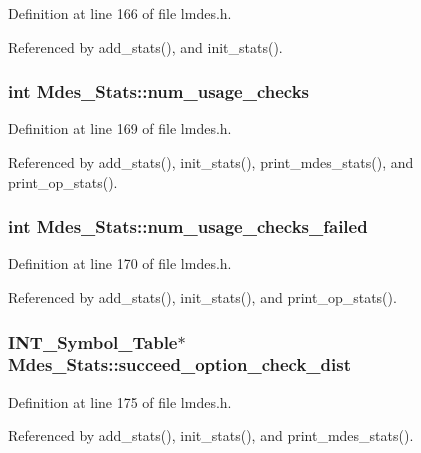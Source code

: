 Definition at line 166 of file lmdes.h.

Referenced by add\_\-stats(), and init\_\-stats().
\subsubsection{\setlength{\rightskip}{0pt plus 5cm}int \bf{Mdes\_\-Stats::num\_\-usage\_\-checks}}\label{structMdes__Stats_c1953e8ba6a6e02b8a45e5002aaed28f}




Definition at line 169 of file lmdes.h.

Referenced by add\_\-stats(), init\_\-stats(), print\_\-mdes\_\-stats(), and print\_\-op\_\-stats().
\subsubsection{\setlength{\rightskip}{0pt plus 5cm}int \bf{Mdes\_\-Stats::num\_\-usage\_\-checks\_\-failed}}\label{structMdes__Stats_94c6d4d26147f0973a10d6df96a8f44c}




Definition at line 170 of file lmdes.h.

Referenced by add\_\-stats(), init\_\-stats(), and print\_\-op\_\-stats().
\subsubsection{\setlength{\rightskip}{0pt plus 5cm}\bf{INT\_\-Symbol\_\-Table}$\ast$ \bf{Mdes\_\-Stats::succeed\_\-option\_\-check\_\-dist}}\label{structMdes__Stats_7bb1d0ee4d650ba2e782aa9e7a043688}




Definition at line 175 of file lmdes.h.

Referenced by add\_\-stats(), init\_\-stats(), and print\_\-mdes\_\-stats().
